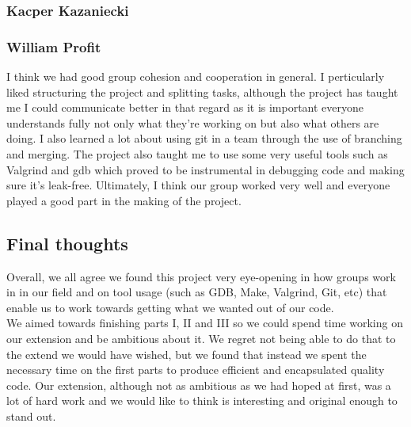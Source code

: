 \documentclass[11pt]{article}
\begin{document}
\subsubsection{Kacper Kazaniecki}
\subsubsection{William Profit}
I think we had good group cohesion and cooperation in general. I perticularly
liked structuring the project and splitting tasks, although the project has
taught me I could communicate better in that regard as it is important everyone
understands fully not only what they're working on but also what others are doing. I also
learned a lot about using git in a team through the use of branching and
merging. The project also taught me to use some very useful tools such as
Valgrind and gdb which proved to be instrumental in debugging code and making
sure it's leak-free. Ultimately, I think our group worked very well and everyone
played a good part in the making of the project.

\subsection{Final thoughts}
Overall, we all agree we found this project very eye-opening in how 
groups work in in our field and on tool usage (such as GDB, Make,
Valgrind, Git, etc) that enable us to work towards getting what we 
wanted out of our code. \\
We aimed towards finishing parts I, II and III so we could spend time
working on our extension and be ambitious about it. We regret not being
able to do that to the extend we would have wished, but we found that 
instead we spent the necessary time on the first parts to produce 
efficient and encapsulated quality code. Our extension, although not
as ambitious as we had hoped at first, was a lot of hard work and we 
would like to think is interesting and original enough to stand out.
\end{document}
